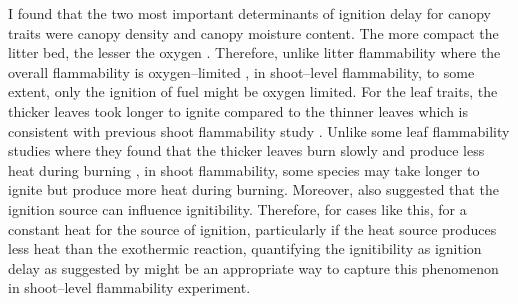 \documentclass{ttuthes2007}
\begin{document}
I found that the two most important determinants of ignition delay for canopy traits were canopy density and canopy moisture content.
The more compact the litter bed, the lesser the oxygen  \citep{scarff2006leaf, van2012species, engber2012patterns, de2012leaf,cornwell2015flammability}. %
Therefore, unlike litter flammability where the overall flammability is oxygen--limited \citep{schwilk2015dimensions}, in shoot--level flammability, to some extent, only the ignition of fuel might be oxygen limited. %
For the leaf traits, the thicker leaves took longer to ignite compared to the thinner leaves which is consistent with previous shoot flammability study \citep{alam2020shoot}.  %
Unlike some leaf flammability studies where they found that the thicker leaves burn slowly and produce less heat during burning \citep{mason2016fire}, in shoot flammability, some species may take longer to ignite but produce more heat during burning. Moreover, \citet{madrigal2012evaluation} also suggested that the ignition source can influence ignitibility. Therefore, for cases like this, for a constant heat for the source of ignition, particularly if the heat source produces less heat than the exothermic reaction, quantifying the ignitibility as ignition delay as suggested by \citep{anderson1970forest} might be an appropriate way to capture this phenomenon in shoot--level flammability experiment.
\end{document}
